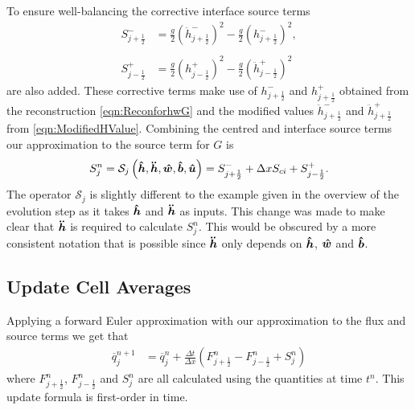 To ensure well-balancing the corrective interface source terms
	\begin{align*}
	 S^{-}_{j + \frac{1}{2}} &=  \frac{g}{2} \left(\ddot{h}^{-}_{j + \frac{1}{2}} \right)^2 - \frac{g}{2} \left(h^{-}_{j + \frac{1}{2}} \right)^2, \\ \\
	  S^{+}_{j - \frac{1}{2}} &=  \frac{g}{2} \left(h^{+}_{j - \frac{1}{2}}\right)^2 - \frac{g}{2}\left(\ddot{h}^{+}_{j - \frac{1}{2}}\right)^2 
	\end{align*}
are also added. These corrective terms make use of $h^{-}_{j + \frac{1}{2}}$ and $h^{+}_{j + \frac{1}{2}}$ obtained from the reconstruction \eqref{eqn:ReconforhwG} and the modified values $\ddot{h}^{-}_{j + \frac{1}{2}}$ and $\ddot{h}^{+}_{j + \frac{1}{2}}$ from \eqref{eqn:ModifiedHValue}. Combining the centred and interface source terms our approximation to the source term for $G$ is 
\begin{equation*}
S^n_j = \mathcal{S}_j\left( \boldsymbol{\hat{h}},\boldsymbol{\ddot{h}},\boldsymbol{\hat{w}},\boldsymbol{\hat{b}}, \boldsymbol{\hat{u}}  \right)=   S^{-}_{j + \frac{1}{2}} + \Delta x S_{ci} + S^{+}_{j - \frac{1}{2}}.
\end{equation*}
The operator $\mathcal{S}_j$ is slightly different to the example given in the overview of the evolution step as it takes $\boldsymbol{\hat{h}}$ and $\boldsymbol{\ddot{h}}$ as inputs. This change was made to make clear that $\boldsymbol{\ddot{h}}$ is required to calculate $S^n_j$. This would be obscured by a more consistent notation that is possible since $\boldsymbol{\ddot{h}}$ only depends on $\boldsymbol{\hat{h}}$, $\boldsymbol{\hat{w}}$ and $\boldsymbol{\hat{b}}$. 


\subsection{Update Cell Averages}
Applying a forward Euler approximation with our approximation to the flux and source terms we get that
\begin{align}
\overline{q}^{n+1}_j &= \overline{q}^{n}_j + \frac{\Delta t}{\Delta x} \left(F^n_{j+\frac{1}{2}} - F^n_{j-\frac{1}{2}} + S^n_j\right)
\label{eqn:UpdateMethod}
\end{align}
where $F^n_{j+\frac{1}{2}}$, $F^n_{j-\frac{1}{2}}$ and $S^n_j$ are all calculated using the quantities at time $t^n$. This update formula is first-order in time.


